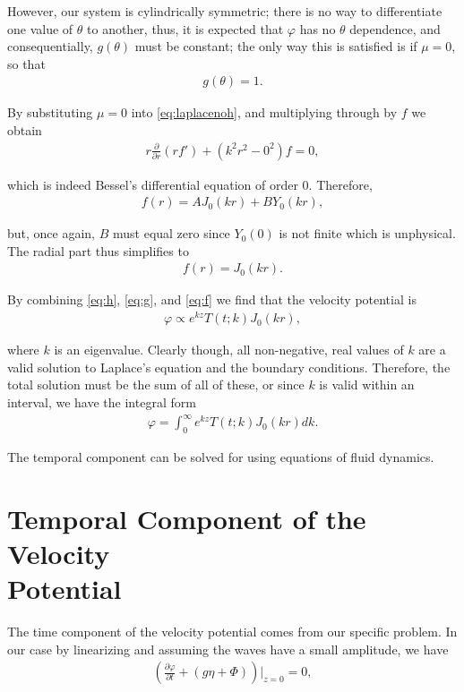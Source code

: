 However, our system is cylindrically symmetric; there is no way to differentiate one value of $\theta$ to another, thus, it is expected that $\varphi$ has no $\theta$ dependence, and consequentially, $g(\theta)$ must be constant; the only way this is satisfied is if $\mu = 0$, so that
\begin{align}
\label{eq:g}
g(\theta) = 1.
\end{align}

By substituting $\mu = 0$ into \eqref{eq:laplacenoh}, and multiplying through by $f$ we obtain
\begin{align*}
r \frac{\partial}{\partial r}(rf') + (k^2r^2 - 0^2)f = 0,
\end{align*}

which is indeed Bessel's differential equation of order $0$. Therefore,
\begin{align*}
f(r) = A J_0(kr) + B Y_0(kr),
\end{align*}

but, once again, $B$ must equal zero since $Y_0(0)$ is not finite which is unphysical. The radial part thus simplifies to
\begin{align}
\label{eq:f}
f(r) = J_0(kr).
\end{align}

By combining \eqref{eq:h}, \eqref{eq:g}, and \eqref{eq:f} we find that the velocity potential is 
\begin{align*}
\varphi \propto e^{kz}T(t;k)J_0(kr),
\end{align*}

where $k$ is an eigenvalue. Clearly though, all non-negative, real values of $k$ are a valid solution to Laplace's equation and the boundary conditions. Therefore, the total solution must be the sum of all of these, or since $k$ is valid within an interval, we have the integral form 
\begin{align}
\label{eq:phieigen}
\varphi = \int_0^\infty e^{kz}T(t;k)J_0(kr)dk.
\end{align}

The temporal component can be solved for using equations of fluid dynamics.

\section{Temporal Component of the Velocity \\ Potential}

The time component of the velocity potential comes from our specific problem. In our case by linearizing and assuming the waves have a small amplitude, we have
\begin{align*}
\left( \frac{\partial \varphi}{\partial t} + (g \eta + \Phi) \right) \bigg|_{z=0} = 0,
\end{align*}


